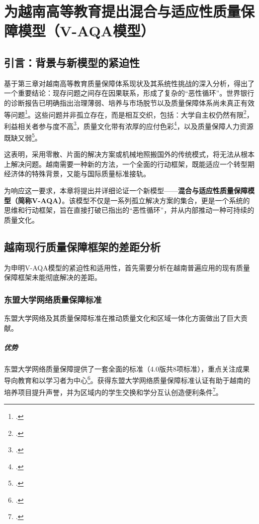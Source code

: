 

\chapter{为越南高等教育提出混合与适应性质量保障模型（V-AQA模型）}
\label{chap:de_xuat_vqa}

\section[引言]{引言：背景与新模型的紧迫性}

基于第三章对越南高等教育质量保障体系现状及其系统性挑战的深入分析，得出了一个重要结论：现存问题之间存在因果联系，形成了复杂的“恶性循环”。世界银行的诊断报告已明确指出治理薄弱、培养与市场脱节以及质量保障体系尚未真正有效等问题\footcite{worldbank_improvingperformance}。这些问题并非孤立存在，而是相互交织，包括：大学自主权仍然有限\footcite{worldbank_improvingperformance}，利益相关者参与度不高\footcite{pmc_article_9127449}，质量文化带有浓厚的应付色彩\footcite{vjol_reactiveculture}，以及质量保障人力资源既缺又弱\footcite{pmc_article_9127449}。

这表明，采用零散、片面的解决方案或机械地照搬国外的传统模式，将无法从根本上解决问题。越南需要一种新的方法，一个全面的行动框架，既能适应一个转型期经济体的特殊背景，又能与国际质量标准接轨。

为响应这一要求，本章将提出并详细论证一个新模型——\textbf{混合与适应性质量保障模型（简称V-AQA）}。该模型不仅是一系列孤立解决方案的集合，更是一个系统的思维和行动框架，旨在直接打破已指出的“恶性循环”，并从内部推动一种可持续的质量文化。

\section{越南现行质量保障框架的差距分析}
\label{sec:phan_tich_khoang_trong}

为申明V-AQA模型的紧迫性和适用性，首先需要分析在越南普遍应用的现有质量保障框架未能彻底解决的差距。

\subsection{东盟大学网络质量保障标准}

东盟大学网络及其质量保障标准在推动质量文化和区域一体化方面做出了巨大贡献。

\paragraph{优势} 东盟大学网络质量保障提供了一套全面的标准（4.0版共8项标准），重点关注成果导向教育和以学习者为中心\footcite{AUN-QAGuide}。获得东盟大学网络质量保障标准认证有助于越南的培养项目提升声誉，并为区域内的学生交换和学分互认创造便利条件\footcite{hoasen_benefits_aunqa}。

